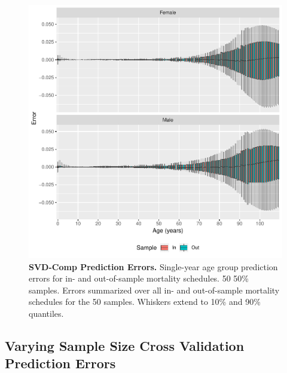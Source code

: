 \documentclass[11pt]{article}
\begin{document}
\begin{figure}[htbp]
   \centering
   \includegraphics[width=\linewidth]{../figures/fig4.pdf} 
   \captionsetup{format=plain,font=normalsize,margin=0cm,justification=justified}
   \caption{\textbf{SVD-Comp Prediction Errors.}  Single-year age group prediction errors for in- and out-of-sample mortality schedules.  50 50\% samples.  Errors summarized over all in- and out-of-sample mortality schedules for the 50 samples. Whiskers extend to 10\% and 90\% quantiles.}
   \label{fig:ageSpecErr}
\end{figure}

\subsection{Varying Sample Size Cross Validation Prediction Errors} \label{sec:res:sampSize}
\end{document}
